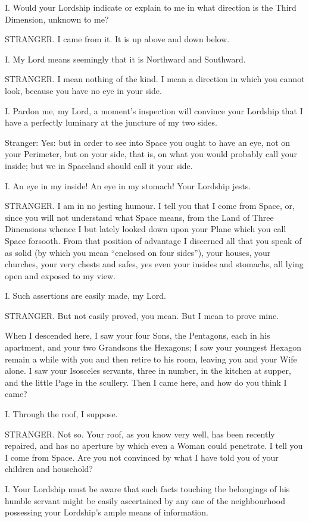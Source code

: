 \documentclass[12pt, a4paper, oneside]{memoir}
\begin{document}
I. Would your Lordship indicate or explain to me in what direction is the
Third Dimension, unknown to me?

STRANGER. I came from it. It is up above and down below.

I. My Lord means seemingly that it is Northward and Southward.

STRANGER. I mean nothing of the kind. I mean a direction in which you cannot
look, because you have no eye in your side.

I. Pardon me, my Lord, a moment's inspection will convince your Lordship that
I have a perfectly luminary at the juncture of my two sides.

Stranger: Yes: but in order to see into Space you ought to have an eye, not on
your Perimeter, but on your side, that is, on what you would probably call
your inside; but we in Spaceland should call it your side.

I. An eye in my inside! An eye in my stomach! Your Lordship jests.

STRANGER. I am in no jesting humour. I tell you that I come from Space, or,
since you will not understand what Space means, from the Land of Three
Dimensions whence I but lately looked down upon your Plane which you call
Space forsooth. From that position of advantage I discerned all that you speak
of as solid (by which you mean ``enclosed on four sides''), your houses, your
churches, your very chests and safes, yes even your insides and stomachs, all
lying open and exposed to my view.

I. Such assertions are easily made, my Lord.

STRANGER. But not easily proved, you mean. But I mean to prove mine.

When I descended here, I saw your four Sons, the Pentagons, each in his
apartment, and your two Grandsons the Hexagons; I saw your youngest Hexagon
remain a while with you and then retire to his room, leaving you and your Wife
alone. I saw your Isosceles servants, three in number, in the kitchen at
supper, and the little Page in the scullery. Then I came here, and how do you
think I came?

I. Through the roof, I suppose.

STRANGER. Not so. Your roof, as you know very well, has been recently
repaired, and has no aperture by which even a Woman could penetrate. I tell
you I come from Space. Are you not convinced by what I have told you of your
children and household?

I. Your Lordship must be aware that such facts touching the belongings of his
humble servant might be easily ascertained by any one of the neighbourhood
possessing your Lordship's ample means of information.
\end{document}
